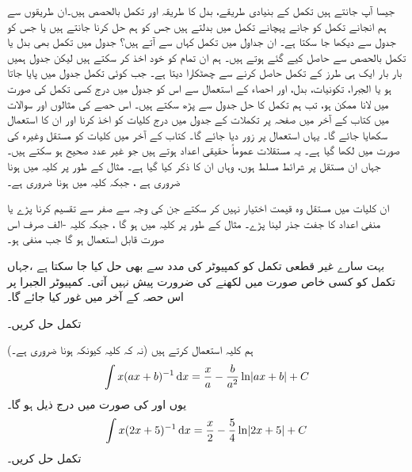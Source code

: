 


جیسا آپ جانتے ہیں تکمل کے بنیادی طریقے،  بدل کا طریقہ  اور تکمل بالحصص ہیں۔ان طریقوں سے  ہم انجانے تکمل کو جانے پہچانے تکمل میں بدلتے ہیں جس کو ہم حل کرنا جانتے ہیں یا جس کو جدول سے دیکھا جا سکتا ہے۔ ان جداول  میں تکمل کہاں سے آتے ہیں؟ جدول میں تکمل بھی بدل یا تکمل بالحصص سے حاصل کیے گئے ہوتے ہیں۔ ہم ان تمام کو خود اخذ  کر سکتے ہیں لیکن جدول ہمیں بار بار ایک ہی طرز کے تکمل حاصل کرنے سے چھٹکارا دیتا ہے۔ جب کوئی تکمل جدول میں پایا جاتا ہو یا الجبرا، تکونیات، بدل،  اور احصاء کے استعمال سے اس کو جدول میں درج کسی تکمل کی صورت میں لانا ممکن ہو، تب ہم تکمل کا حل جدول سے پڑھ سکتے ہیں۔ اس حصے  کی مثالوں اور سوالات میں  کتاب کے آخر میں صفحہ  پر تکملات کے جدول میں درج کلیات کو اخذ کرنا اور ان کا استعمال سکھایا جائے گا۔ یہاں استعمال پر زور دیا جائے گا۔ کتاب کے آخر میں کلیات کو مستقل   وغیرہ کی صورت میں لکھا گیا ہے۔ یہ مستقلات  عموماً حقیقی اعداد ہوتے ہیں  جو غیر عدد صحیح ہو سکتے ہیں۔ جہاں ان مستقل پر شرائط مسلط ہوں، وہاں ان  کا ذکر کیا گیا ہے۔ مثال کے طور پر کلیہ  میں  ہونا ضروری ہے ، جبکہ کلیہ   میں  ہونا ضروری ہے۔ 

ان کلیات میں  مستقل وہ قیمت اختیار نہیں کر سکتے  جن کی وجہ سے صفر سے تقسیم کرنا پڑے یا منفی اعداد کا جفت جذر لینا پڑے۔ مثال کے طور پر کلیہ  میں  ہو گا ، جبکہ کلیہ -الف صرف اس صورت قابل استعمال ہو گا جب  منفی ہو۔ 

بہت سارے غیر قطعی تکمل کو کمپیوٹر کی مدد سے بھی حل کیا جا سکتا ہے ،جہاں تکمل کو کسی خاص صورت میں لکھنے کی ضرورت پیش نہیں آتی۔ کمپیوٹر الجبرا پر اس حصہ کے آخر میں غور کیا جائے گا۔

تکمل  حل کریں۔

ہم کلیہ  استعمال کرتے ہیں (نہ کہ کلیہ   کیونکہ   ہونا ضروری ہے۔)
\begin{align*}
\int x(ax+b)^{-1}\dif x=\frac{x}{a}-\frac{b}{a^2}\ln\abs{ax+b}+C
\end{align*}
یوں  اور  کی صورت میں درج ذیل ہو گا۔
\begin{align*}
\int x(2x+5)^{-1}\dif x=\frac{x}{2}-\frac{5}{4}\ln\abs{2x+5}+C
\end{align*}
تکمل  حل کریں۔

